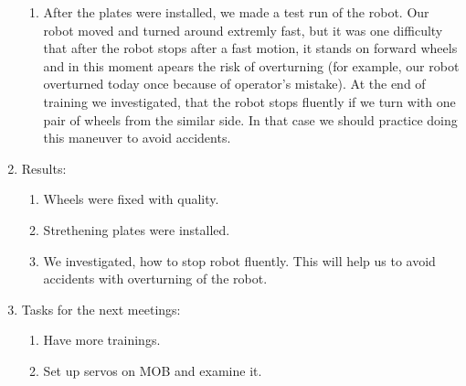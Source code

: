 \begin{enumerate}
\begin{enumerate}
        \item After the plates were installed, we made a test run of the robot. Our robot moved and turned around extremly fast, but it was one difficulty that after the robot stops after a fast motion, it stands on forward wheels and in this moment apears the risk of overturning (for example, our robot overturned today once because of operator's mistake). At the end of training we investigated, that the robot stops fluently if we turn with one pair of wheels from the similar side. In that case we should practice doing this maneuver to avoid accidents.
		
	\end{enumerate}
	
	\item Results:
	\begin{enumerate}
		
		\item Wheels were fixed with quality.
		
		\item Strethening plates were installed.
		
        \item We investigated, how to stop robot fluently. This will help us to avoid accidents with overturning of the robot.
		
	\end{enumerate}
	
	\item Tasks for the next meetings:
	\begin{enumerate}
		
		\item Have more trainings.
		
		\item Set up servos on MOB and examine it.
			
	\end{enumerate}
\end{enumerate}
\fillpage

